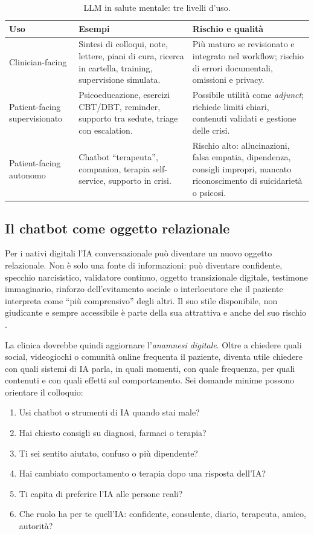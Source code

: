 \documentclass[11pt,a4paper]{article}
\begin{document}
\begin{table}[htbp]
\centering\small
\caption{LLM in salute mentale: tre livelli d'uso.}
\label{tab:llm}
\begin{tabularx}{\textwidth}{>{\RaggedRight}p{3.2cm} Y Y}
\toprule
\textbf{Uso} & \textbf{Esempi} & \textbf{Rischio e qualità} \\
\midrule
Clinician-facing & Sintesi di colloqui, note, lettere, piani di cura, ricerca in cartella, training, supervisione simulata. & Più maturo se revisionato e integrato nel workflow; rischio di errori documentali, omissioni e privacy. \\
\addlinespace
Patient-facing supervisionato & Psicoeducazione, esercizi CBT/DBT, reminder, supporto tra sedute, triage con escalation. & Possibile utilità come \emph{adjunct}; richiede limiti chiari, contenuti validati e gestione delle crisi. \\
\addlinespace
Patient-facing autonomo & Chatbot ``terapeuta'', companion, terapia self-service, supporto in crisi. & Rischio alto: allucinazioni, falsa empatia, dipendenza, consigli impropri, mancato riconoscimento di suicidarietà o psicosi. \\
\bottomrule
\end{tabularx}
\end{table}

\subsection{Il chatbot come oggetto relazionale}
\label{sec:oggetto}

Per i nativi digitali l'IA conversazionale può diventare un nuovo oggetto relazionale. Non è solo una fonte di informazioni: può diventare confidente, specchio narcisistico, validatore continuo, oggetto transizionale digitale, testimone immaginario, rinforzo dell'evitamento sociale o interlocutore che il paziente interpreta come ``più comprensivo'' degli altri. Il suo stile disponibile, non giudicante e sempre accessibile è parte della sua attrattiva e anche del suo rischio \cite{dohnany2025}.

La clinica dovrebbe quindi aggiornare l'\emph{anamnesi digitale}. Oltre a chiedere quali social, videogiochi o comunità online frequenta il paziente, diventa utile chiedere con quali sistemi di IA parla, in quali momenti, con quale frequenza, per quali contenuti e con quali effetti sul comportamento. Sei domande minime possono orientare il colloquio:

\begin{enumerate}[itemsep=2pt]
\item Usi chatbot o strumenti di IA quando stai male?
\item Hai chiesto consigli su diagnosi, farmaci o terapia?
\item Ti sei sentito aiutato, confuso o più dipendente?
\item Hai cambiato comportamento o terapia dopo una risposta dell'IA?
\item Ti capita di preferire l'IA alle persone reali?
\item Che ruolo ha per te quell'IA: confidente, consulente, diario, terapeuta, amico, autorità?
\end{enumerate}
\end{document}
